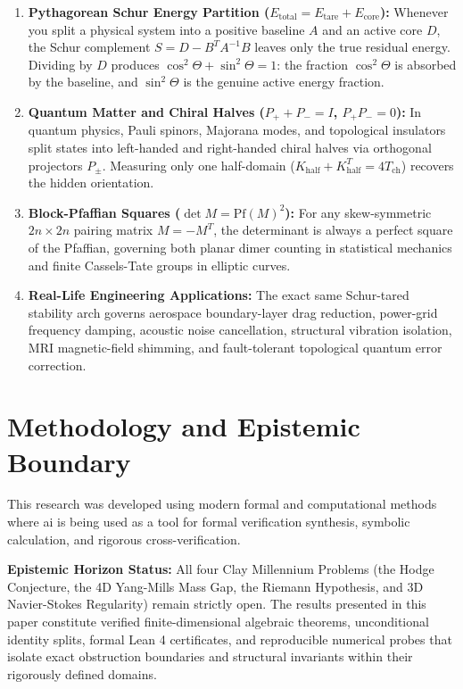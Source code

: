 \documentclass[11pt,a4paper]{article}
\theoremstyle{definition}
\begin{document}
\begin{enumerate}
  \item \textbf{Pythagorean Schur Energy Partition ($E_{\mathrm{total}} = E_{\mathrm{tare}} + E_{\mathrm{core}}$):} Whenever you split a physical system into a positive baseline $A$ and an active core $D$, the Schur complement $S = D - B^T A^{-1} B$ leaves only the true residual energy. Dividing by $D$ produces $\cos^2\Theta + \sin^2\Theta = 1$: the fraction $\cos^2\Theta$ is absorbed by the baseline, and $\sin^2\Theta$ is the genuine active energy fraction.
  \item \textbf{Quantum Matter and Chiral Halves ($P_+ + P_- = I$, $P_+ P_- = 0$):} In quantum physics, Pauli spinors, Majorana modes, and topological insulators split states into left-handed and right-handed chiral halves via orthogonal projectors $P_\pm$. Measuring only one half-domain ($K_{\mathrm{half}} + K_{\mathrm{half}}^T = 4 T_{\mathrm{ch}}$) recovers the hidden orientation.
  \item \textbf{Block-Pfaffian Squares ($\det M = \mathrm{Pf}(M)^2$):} For any skew-symmetric $2n \times 2n$ pairing matrix $M = -M^T$, the determinant is always a perfect square of the Pfaffian, governing both planar dimer counting in statistical mechanics and finite Cassels-Tate groups in elliptic curves.
  \item \textbf{Real-Life Engineering Applications:} The exact same Schur-tared stability arch governs aerospace boundary-layer drag reduction, power-grid frequency damping, acoustic noise cancellation, structural vibration isolation, MRI magnetic-field shimming, and fault-tolerant topological quantum error correction.
\end{enumerate}

\section{Methodology and Epistemic Boundary}
\noindent This research was developed using modern formal and computational methods where ai is being used as a tool for formal verification synthesis, symbolic calculation, and rigorous cross-verification.

\vspace{0.5em}
\noindent\textbf{Epistemic Horizon Status:} All four Clay Millennium Problems (the Hodge Conjecture, the 4D Yang-Mills Mass Gap, the Riemann Hypothesis, and 3D Navier-Stokes Regularity) remain strictly open. The results presented in this paper constitute verified finite-dimensional algebraic theorems, unconditional identity splits, formal Lean 4 certificates, and reproducible numerical probes that isolate exact obstruction boundaries and structural invariants within their rigorously defined domains.
\end{document}
